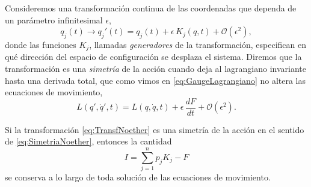         Consideremos una transformación continua de las coordenadas que dependa de un parámetro infinitesimal $\epsilon$,
        \begin{equation}\label{eq:TransfNoether}
            q_{j}(t) \longrightarrow q_{j}'(t) = q_{j}(t) + \epsilon\,K_{j}(q,t) + \mathcal{O}(\epsilon^{2}),
        \end{equation}
        donde las funciones $K_{j}$, llamadas \textit{generadores} de la transformación, especifican en qué dirección del espacio de configuración se desplaza el sistema. Diremos que la transformación es una \textit{simetría} de la acción cuando deja al lagrangiano invariante hasta una derivada total, que como vimos en \eqref{eq:GaugeLagrangiano} no altera las ecuaciones de movimiento,
        \begin{equation}\label{eq:SimetriaNoether}
            L(q',\dot{q}',t) = L(q,\dot{q},t) + \epsilon\,\frac{dF}{dt} + \mathcal{O}(\epsilon^{2}) .
        \end{equation}

        \begin{myteo}[Noether]\label{teo:Noether}
            Si la transformación \eqref{eq:TransfNoether} es una simetría de la acción en el sentido de \eqref{eq:SimetriaNoether}, entonces la cantidad
            \begin{equation}\label{eq:CargaNoether}
                I = \sum_{j=1}^{n} p_{j}K_{j} - F
            \end{equation}
            se conserva a lo largo de toda solución de las ecuaciones de movimiento.
        \end{myteo}

